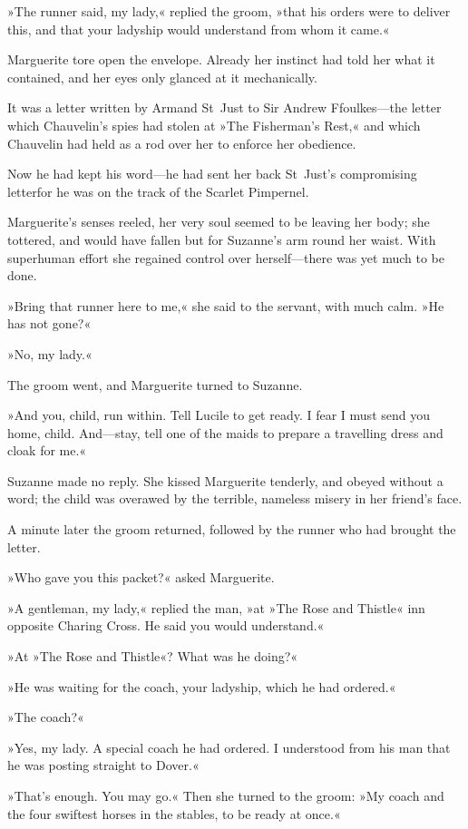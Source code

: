 »The runner said, my lady,« replied the groom, »that his orders were to deliver this, and that your ladyship would understand from whom it came.«

Marguerite tore open the envelope. Already her instinct had told her what it contained, and her eyes only glanced at it mechanically.

It was a letter written by Armand St~Just to Sir Andrew Ffoulkes—the letter which Chauvelin's spies had stolen at »The Fisherman's Rest,« and which Chauvelin had held as a rod over her to enforce her obedience.

Now he had kept his word—he had sent her back St~Just's compromising letter\textellipsis \allowbreak  for he was on the track of the Scarlet Pimpernel.

Marguerite's senses reeled, her very soul seemed to be leaving her body; she tottered, and would have fallen but for Suzanne's arm round her waist. With superhuman effort she regained control over herself—there was yet much to be done.

»Bring that runner here to me,« she said to the servant, with much calm. »He has not gone?«

»No, my lady.«

The groom went, and Marguerite turned to Suzanne.

»And you, child, run within. Tell Lucile to get ready. I fear I must send you home, child. And—stay, tell one of the maids to prepare a travelling dress and cloak for me.«

Suzanne made no reply. She kissed Marguerite tenderly, and obeyed without a word; the child was overawed by the terrible, nameless misery in her friend's face.

A minute later the groom returned, followed by the runner who had brought the letter.

»Who gave you this packet?« asked Marguerite.

»A gentleman, my lady,« replied the man, »at »The Rose and Thistle« inn opposite Charing Cross. He said you would understand.«

»At »The Rose and Thistle«? What was he doing?«

»He was waiting for the coach, your ladyship, which he had ordered.«

»The coach?«

»Yes, my lady. A special coach he had ordered. I understood from his man that he was posting straight to Dover.«

»That's enough. You may go.« Then she turned to the groom: »My coach and the four swiftest horses in the stables, to be ready at once.«

